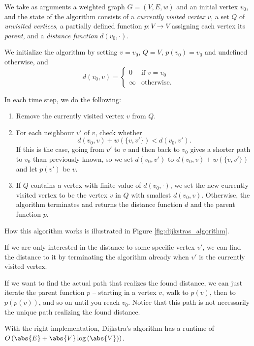\documentclass[nobib]{tufte-handout}
\begin{document}
\begin{definition}
  We take as arguments a weighted graph $G = (V,E,w)$ and an initial vertex $v_0$, and the state of the algorithm consists of a \emph{currently visited vertex} $v$, a set $Q$ of \emph{unvisited vertices}, a partially defined function $p: V \to V$ assigning each vertex its \emph{parent}, and a \emph{distance function} $d(v_0, \cdot)$.
  
  We initialize the algorithm by setting $v = v_0$, $Q = V$, $p(v_0) = v_0$ and undefined otherwise, and
  $$d(v_0, v) = \begin{cases}
    0&\text{if }v=v_0\\
    \infty&\text{otherwise.}
  \end{cases}$$

  In each time step, we do the following:
  \begin{enumerate}
    \item Remove the currently visited vertex $v$ from $Q$.
    \item For each neighbour $v'$ of $v$, check whether
          $$d(v_0, v) + w(\{v, v'\}) < d(v_0, v').$$
          If this is the case, going from $v'$ to $v$ and then back to $v_0$ gives a shorter path to $v_0$ than previously known, so we set $d(v_0, v')$ to $d(v_0, v) + w(\{v, v'\})$ and let $p(v')$ be $v$.
    \item If $Q$ contains a vertex with finite value of $d(v_0, \cdot)$, we set the new currently visited vertex to be the vertex $v$ in $Q$ with smallest $d(v_0,v)$. Otherwise, the algorithm terminates and returns the distance function $d$ and the parent function $p$.
  \end{enumerate}

  How this algorithm works is illustrated in Figure \ref{fig:dijkstras_algorithm}.
\end{definition}

\begin{remark}
  If we are only interested in the distance to some specific vertex $v'$, we can find the distance to it by terminating the algorithm already when $v'$ is the currently visited vertex.

  If we want to find the actual path that realizes the found distance, we can just iterate the parent function $p$ -- starting in a vertex $v$, walk to $p(v)$, then to $p(p(v))$, and so on until you reach $v_0$. Notice that this path is not necessarily the unique path realizing the found distance.

  With the right implementation, Dijkstra's algorithm has a runtime of $O\left(\abs{E} + \abs{V}\log\left(\abs{V}\right)\right)$.
\end{remark}
\end{document}
